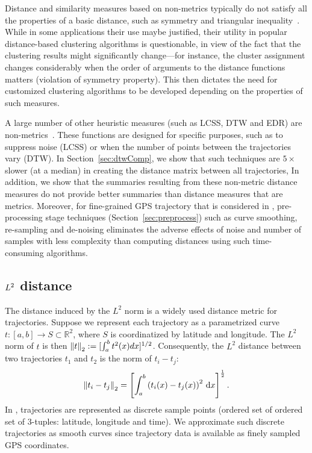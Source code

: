 Distance and similarity measures based on non-metrics typically do not satisfy all the properties of a basic distance, such as symmetry and triangular inequality~\cite{Chen2004}. While in some applications their use maybe justified, their utility in popular distance-based clustering algorithms is questionable, in view of the fact that the clustering results might significantly change---for instance, the cluster assignment changes considerably when the order of arguments to the distance functions matters (violation of symmetry property). This then dictates the need for customized clustering algorithms to be developed depending on the properties of such measures. 

A large number of other heuristic measures (such as LCSS, DTW and EDR) are non-metrics~\cite{Vlachos2002,Yi1998,Chen2005}. These functions are designed for specific purposes, such as to suppress noise (LCSS) or when the number of points between the trajectories vary (DTW). In Section~\ref{sec:dtwComp}, we show that such techniques are $5\times$ slower (at a median) in creating the distance matrix between all trajectories, In addition, we show that the summaries resulting from these non-metric distance measures do not provide better summaries than distance measures that are metrics. 
Moreover, for fine-grained GPS trajectory that is considered in \trajSummary, pre-processing stage techniques (Section~\ref{sec:preprocess}) such as curve smoothing, re-sampling and de-noising eliminates the adverse effects of noise and number of samples with less complexity than computing distances using such time-consuming algorithms. 

\subsection{$L^2$ distance}
The distance induced by the $L^2$ norm is a widely used distance metric for trajectories. Suppose we represent each trajectory as a parametrized curve $t:[a,b]\rightarrow S \subset \mathbb{R}^2$, where $S$ is coordinatized by latitude and longitude. The $L^2$ norm of $t$ is then $\left\lVert t\right\rVert_2:=[\int _a^b t^2(x)dx]^{1/2}$. Consequently, the $L^2$ distance between two trajectories $t_1$ and $t_2$ is the norm of $t_i-t_j$:
\begin{align}
\left\lVert t_i-t_j\right\rVert_2 = \left[ \int_{a}^{b}{\left(t_i(x) - t_j(x) \right )^2\, \mathrm{d}x }\right] ^ {\frac{1}{2}}.
\end{align}
In \trajSummary, trajectories are represented as discrete sample points (ordered set of ordered set of 3-tuples: latitude, longitude and time). We approximate such discrete trajectories as smooth curves since trajectory data is available as finely sampled GPS coordinates. 

